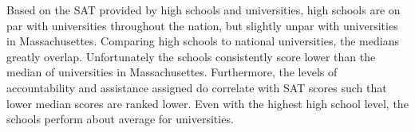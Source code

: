\documentclass[11pt]{article}
\begin{document}
Based on the SAT provided by high schools and universities, high schools
are on par with universities throughout the nation, but slightly unpar
with universities in Massachusettes. Comparing high schools to national
universities, the medians greatly overlap. Unfortunately the schools
consistently score lower than the median of universities in
Massachusettes. Furthermore, the levels of accountability and assistance
assigned do correlate with SAT scores such that lower median scores are
ranked lower. Even with the highest high school level, the schools
perform about average for universities.


    
    
    
    
\end{document}
